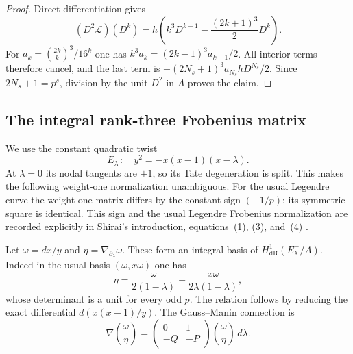 \documentclass[11pt,a4paper]{article}
\begin{document}
\begin{proof}
Direct differentiation gives
\[
 (D^2\mathcal L)(D^k)
   =h\left(k^3D^{k-1}-\frac{(2k+1)^3}{2}D^k\right).
\]
For $a_k=\binom{2k}{k}^3/16^k$ one has
$k^3a_k=(2k-1)^3a_{k-1}/2$.  All interior terms therefore cancel, and
the last term is $-(2N_s+1)^3a_{N_s}hD^{N_s}/2$.
Since $2N_s+1=p^s$, division by the unit $D^2$ in $A$ proves the claim.
\end{proof}

\subsection{The integral rank-three Frobenius matrix}

We use the constant quadratic twist
\[
 E^-_\lambda:\quad y^2=-x(x-1)(x-\lambda).
\]
At $\lambda=0$ its nodal tangents are $\pm1$, so its Tate degeneration
is split.  This makes the following weight-one normalization unambiguous.
For the usual Legendre curve the weight-one matrix differs by the
constant sign $(-1/p)$; its symmetric square is identical.  This sign
and the usual Legendre Frobenius normalization are recorded explicitly
in Shirai's introduction, equations~(1), (3), and~(4) \cite{Shirai}.

Let $\omega=dx/y$ and $\eta=\nabla_{\partial_\lambda}\omega$.
These form an integral basis of $H^1_{\mathrm{dR}}(E^-_\lambda/A)$.
Indeed in the usual basis $(\omega,x\omega)$ one has
\begin{equation}\label{ss:basis}
 \eta=\frac{\omega}{2(1-\lambda)}
       -\frac{x\omega}{2\lambda(1-\lambda)},
\end{equation}
whose determinant is a unit for every odd $p$.  The relation follows by
reducing the exact differential $d(x(x-1)/y)$.  The Gauss--Manin
connection is
\[
 \nabla\binom{\omega}{\eta}
 =\begin{pmatrix}0&1\\-Q&-P\end{pmatrix}
       \binom{\omega}{\eta}\,d\lambda.
\]
\end{document}
